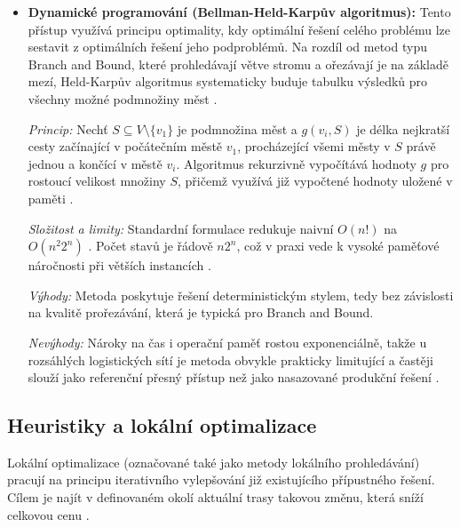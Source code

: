 \begin{itemize}
    \textit{Výhody:} Při účinném prořezávání může výrazně snížit počet prozkoumaných stavů oproti úplnému výčtu.
    
    \textit{Nevýhody:} V nejhorším případě může být běh stále výpočetně náročný \cite{lin1973tsp}.
    
\item \textbf{Dynamické programování (Bellman-Held-Karpův algoritmus):} 
Tento přístup využívá principu optimality, kdy optimální řešení celého problému lze sestavit z optimálních řešení jeho podproblémů. Na rozdíl od metod typu Branch and Bound, které prohledávají větve stromu a ořezávají je na základě mezí, Held-Karpův algoritmus systematicky buduje tabulku výsledků pro všechny možné podmnožiny měst \cite{nguyen2020bhk}.

\textit{Princip:} Nechť $S \subseteq V \setminus \{v_1\}$ je podmnožina měst a $g(v_i, S)$ je délka nejkratší cesty začínající v počátečním městě $v_1$, procházející všemi městy v $S$ právě jednou a končící v městě $v_i$. Algoritmus rekurzivně vypočítává hodnoty $g$ pro rostoucí velikost množiny $S$, přičemž využívá již vypočtené hodnoty uložené v paměti \cite{nguyen2020bhk}.

\textit{Složitost a limity:} Standardní formulace redukuje naivní $O(n!)$ na $O(n^2 2^n)$ \cite{nguyen2020bhk}. Počet stavů je řádově $n 2^n$, což v praxi vede k vysoké paměťové náročnosti při větších instancích \cite{nguyen2020bhk}.

\textit{Výhody:} Metoda poskytuje řešení deterministickým stylem, tedy bez závislosti na kvalitě prořezávání, která je typická pro Branch and Bound.

\textit{Nevýhody:} Nároky na čas i operační paměť rostou exponenciálně, takže u rozsáhlých logistických sítí je metoda obvykle prakticky limitující a častěji slouží jako referenční přesný přístup než jako nasazované produkční řešení \cite{nguyen2020bhk}.
\end{itemize}

\subsection{Heuristiky a lokální optimalizace}
Lokální optimalizace (označované také jako metody lokálního prohledávání) pracují na principu iterativního vylepšování již existujícího přípustného řešení. Cílem je najít v definovaném okolí aktuální trasy takovou změnu, která sníží celkovou cenu \cite{johnson1997tsp_local_search}.

